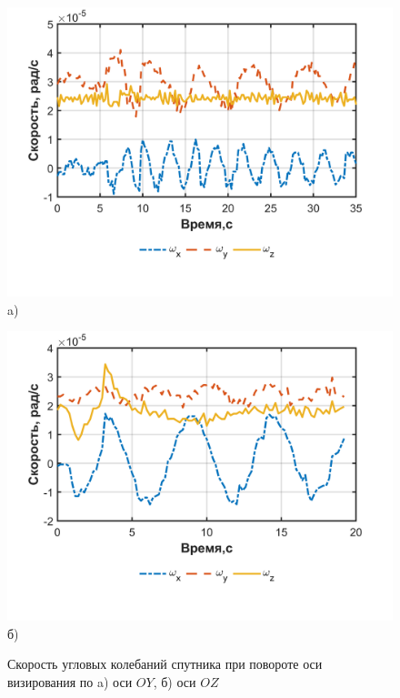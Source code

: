  \begin{figure}[h!]
 	\begin{minipage}[b][][b]{0.49\linewidth}\centering
 		\includegraphics[width=1\linewidth]{matlab/img/sat_gyro_dataY.png} \\ a)
 	\end{minipage}
 	\hfill
 	\begin{minipage}[b][][b]{0.49\linewidth}\centering
 		\includegraphics[width=1\linewidth]{matlab/img/sat_gyro_dataZ.png} \\ б)
 	\end{minipage}
 	\caption{Скорость угловых колебаний спутника при повороте оси визирования по a) оси $OY$, б) оси $OZ$ }
 	\label{fig:rotationYZ}
 \end{figure}
 
